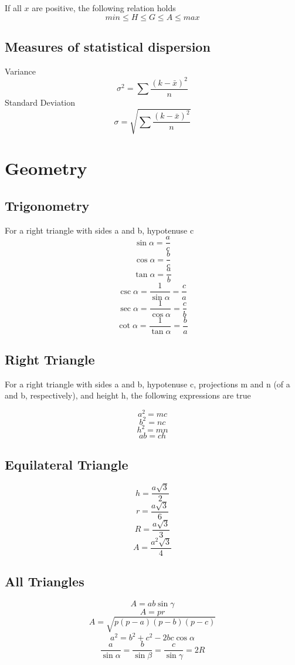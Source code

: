 \documentclass[oneside]{book} %
\theoremstyle{plain}
\newcommand*\mean[1]{\bar{#1}}
\newcommand*\reciprocal[1]{\frac{1}{#1}}
\begin{document}
If all \(x\) are positive, the following relation holds
\[min \le H \le G \le A \le max\]

\section{Measures of statistical dispersion}
Variance
\[\sigma^2 = \sum \frac{\left ( k-\mean{x} \right ) ^ 2}{n}\]
Standard Deviation
\[\sigma = \sqrt{\sum \frac{\left ( k-\mean{x} \right ) ^ 2}{n}}\]

\chapter{Geometry}

\section{Trigonometry}

For a right triangle with sides a and b, hypotenuse c
\[\sin{\alpha} = \frac{a}{c}\]
\[\cos{\alpha} = \frac{b}{c}\]
\[\tan{\alpha} = \frac{a}{b}\]
\[\csc{\alpha} = \reciprocal{\sin{\alpha}} = \frac{c}{a}\]
\[\sec{\alpha} = \reciprocal{\cos{\alpha}} = \frac{c}{b}\]
\[\cot{\alpha} = \reciprocal{\tan{\alpha}} = \frac{b}{a}\]


\section{Right Triangle}
For a right triangle with sides a and b, hypotenuse c, projections m and n (of
a and b, respectively), and height h,
the following expressions are true

\[a^2 = m c\]
\[b^2 = n c\]
\[h^2 = m n\]
\[a b = c h\]

\section{Equilateral Triangle}
\[h = \frac{a \sqrt{3}}{2}\]
\[r = \frac{a \sqrt{3}}{6}\]
\[R = \frac{a \sqrt{3}}{3}\]
\[A = \frac{a^2 \sqrt{3}}{4}\]

\section{All Triangles}
\[A = a b \sin \gamma \]
\[A = p r\]
\[A = \sqrt{p \left ( p - a \right ) \left ( p - b \right ) \left ( p - c
\right )}\]
\[a^2 = b^2 + c^2 - 2 b c \cos \alpha\]
\[\frac{a}{\sin \alpha} = \frac{b}{\sin \beta} = \frac{c}{\sin \gamma} = 2R\]
\end{document}
